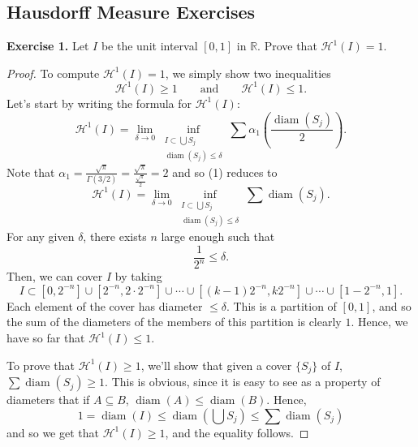 \documentclass[10pt]{article}
\theoremstyle{plain}
\DeclareMathOperator{\diam}{diam}
\begin{document}
\subsection*{Hausdorff Measure Exercises}
	\noindent \textbf{Exercise 1.} Let $I$ be the unit interval $[0, 1]$ in $\mathbb{R}$. Prove that $\mathcal{H}^1(I) = 1$. 
		\begin{proof}
			To compute $\mathcal{H}^1(I) = 1$, we simply show two inequalities $$\mathcal{H}^1(I) \geq 1 \qquad \text{and} \qquad \mathcal{H}^1(I) \leq 1.$$ Let's start by writing the formula for $\mathcal{H}^1(I)$: \begin{equation} \mathcal{H}^1(I) = \lim_{\delta \to 0} \inf_{\substack{I \subset \bigcup S_j \\ \diam(S_j) \leq \delta}} \sum \alpha_1 \left(\frac{\diam(S_j)}{2}\right). \end{equation} 
		Note that $\alpha_1 = \frac{\sqrt{\pi}}{\Gamma(3/2)} = \frac{\sqrt{\pi}}{\frac{\sqrt{\pi}}{2}} = 2$ and so (1) reduces to $$\mathcal{H}^1(I) = \lim_{\delta \to 0} \inf_{\substack{I \subset \bigcup S_j \\ \diam(S_j) \leq \delta}} \sum \diam(S_j).$$ For any given $\delta$, there exists $n$ large enough such that $$\frac{1}{2^n} \leq \delta.$$ Then, we can cover $I$ by taking $$I \subset [0, 2^{-n}] \cup [2^{-n}, 2 \cdot 2^{-n}] \cup \cdots \cup [(k - 1)2^{-n}, k 2^{-n}] \cup \cdots \cup [1 - 2^{-n}, 1].$$ Each element of the cover has diameter $\leq \delta$. This is a partition of $[0, 1]$, and so the sum of the diameters of the members of this partition is clearly $1$. Hence, we have so far that $\mathcal{H}^1(I) \leq 1$. 
		
		
		
		To prove that $\mathcal{H}^1(I) \geq 1$, we'll show that given a cover $\{S_j\}$ of $I$, $\sum \diam(S_j) \geq 1$. This is obvious, since it is easy to see as a property of diameters that if $A \subseteq B$, $\diam(A) \leq \diam(B)$. Hence, $$1 = \diam(I) \leq \diam\left(\bigcup S_j\right) \leq \sum \diam(S_j)$$ and so we get that $\mathcal{H}^1(I) \geq 1$, and the equality follows. 
		\end{proof}
	
\end{document}
